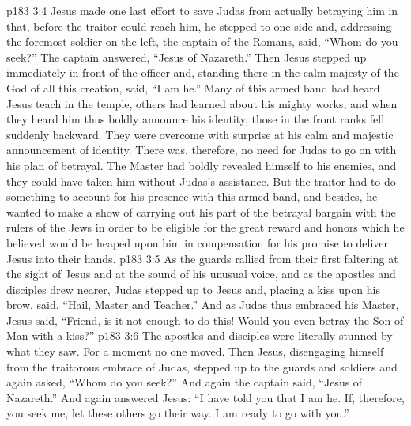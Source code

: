 \vs p183 3:4 Jesus made one last effort to save Judas from actually betraying him in that, before the traitor could reach him, he stepped to one side and, addressing the foremost soldier on the left, the captain of the Romans, said, \textcolor{ubdarkred}{“Whom do you seek?”} The captain answered, “Jesus of Nazareth.” Then Jesus stepped up immediately in front of the officer and, standing there in the calm majesty of the God of all this creation, said, \textcolor{ubdarkred}{“I am he.”} Many of this armed band had heard Jesus teach in the temple, others had learned about his mighty works, and when they heard him thus boldly announce his identity, those in the front ranks fell suddenly backward. They were overcome with surprise at his calm and majestic announcement of identity. There was, therefore, no need for Judas to go on with his plan of betrayal. The Master had boldly revealed himself to his enemies, and they could have taken him without Judas’s assistance. But the traitor had to do something to account for his presence with this armed band, and besides, he wanted to make a show of carrying out his part of the betrayal bargain with the rulers of the Jews in order to be eligible for the great reward and honors which he believed would be heaped upon him in compensation for his promise to deliver Jesus into their hands.
\vs p183 3:5 As the guards rallied from their first faltering at the sight of Jesus and at the sound of his unusual voice, and as the apostles and disciples drew nearer, Judas stepped up to Jesus and, placing a kiss upon his brow, said, “Hail, Master and Teacher.” And as Judas thus embraced his Master, Jesus said, \textcolor{ubdarkred}{“Friend, is it not enough to do this! Would you even betray the Son of Man with a kiss?”}
\vs p183 3:6 The apostles and disciples were literally stunned by what they saw. For a moment no one moved. Then Jesus, disengaging himself from the traitorous embrace of Judas, stepped up to the guards and soldiers and again asked, \textcolor{ubdarkred}{“Whom do you seek?”} And again the captain said, “Jesus of Nazareth.” And again answered Jesus: \textcolor{ubdarkred}{“I have told you that I am he. If, therefore, you seek me, let these others go their way. I am ready to go with you.”}
